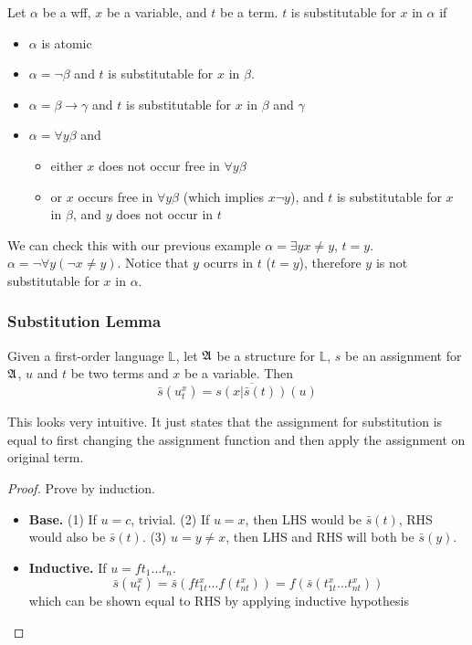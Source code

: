 \begin{definition}[Substitutability]
    Let $\alpha$ be a wff, $x$ be a variable, and $t$ be a term. $t$ is substitutable for $x$ in $\alpha$ if
    \begin{itemize}
        \item $\alpha$ is atomic
        \item $\alpha = \neg\beta$ and $t$ is substitutable for $x$ in $\beta$.
        \item $\alpha = \beta \to \gamma$ and $t$ is substitutable for $x$ in $\beta$ and $\gamma$
        \item $\alpha = \forall y \beta$ and
        \begin{itemize}
            \item either $x$ does not occur free in $\forall y \beta$
            \item or $x$ occurs free in $\forall y\beta$ (which implies $x\neg y$), and $t$ is substitutable for $x$ in $\beta$, and $y$ does not occur in $t$
        \end{itemize}
    \end{itemize}
\end{definition}

We can check this with our previous example $\alpha = \exists y x\neq y$, $t=y$. $\alpha = \neg\forall y (\neg x \neq y)$. Notice that $y$ ocurrs in $t$ ($t=y$), therefore $y$ is not substitutable for $x$ in $\alpha$.

\subsubsection{Substitution Lemma}

\begin{lemma}
    Given a first-order language $\mathbb{L}$, let $\mathfrak{A}$ be a structure for $\mathbb{L}$, $s$ be an assignment for $\mathfrak{A}$, $u$ and $t$ be two terms and $x$ be a variable. Then
    \[ \bar{s}(u_t^x) = \overline{s(x|\bar{s}(t))}(u) \]
\end{lemma}

This looks very intuitive. It just states that the assignment for substitution is equal to first changing the assignment function and then apply the assignment on original term.

\begin{proof}
    Prove by induction.
    \begin{itemize}
        \item[] \textbf{Base.} (1) If $u = c$, trivial. (2) If $u=x$, then LHS would be $\bar{s}(t)$, RHS would also be $\bar{s}(t)$. (3) $u=y\neq x$, then LHS and RHS will both be $\bar{s}(y)$.
        \item[] \textbf{Inductive.} If $u = ft_1\dots t_n$.
        \[ \bar{s}(u_t^x) = \bar{s}(ft_{1t}^x\dots f(t_{nt}^x)) = f(\bar{s}(t_{1t}^x\dots t_{nt}^x)) \]
        which can be shown equal to RHS by applying inductive hypothesis
    \end{itemize}
\end{proof}

